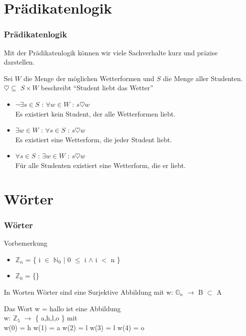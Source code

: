 \documentclass{beamer}
\begin{document}
\section{Prädikatenlogik}
\begin{frame}
	\frametitle{Prädikatenlogik}
	Mit der Prädikatenlogik können wir viele Sachverhalte kurz und präzise 				darstellen.
	\pause
	\begin{block}{}
		Sei $W$ die Menge der möglichen Wetterformen und $S$ die Menge aller 				Studenten.\\
		$\heartsuit \subseteq$ $S \times W$ beschreibt "`Student liebt das 					Wetter"'
		\pause
		\begin{itemize}
			\item $\neg\exists s \in S$ : $\forall w \in W$ : $s \heartsuit w$\\
			\pause
			Es existiert kein Student, der alle Wetterformen liebt.
			\pause
			\item $\exists w \in W$ : $\forall s \in S$ : $s \heartsuit w$\\
			\pause
			Es existiert eine Wetterform, die jeder Student liebt.
			\pause
			\item $\forall s \in S$ : $\exists w \in W$ : $s \heartsuit w$\\
			\pause
			Für alle Studenten existiert eine Wetterform, die er liebt.
		\end{itemize}
	\end{block}
\end{frame}

\section{W\"orter}
\begin{frame}
	\frametitle{Wörter}
	\begin{block}{Vorbemerkung}
		\begin{itemize}
			\item $\mathbb Z_n$ = \pause \{ i $ \in $ $\mathbb N_0$ $ | $ 0 $ \le $ i $ \land $ i $ < $ n \}
			\item $\mathbb Z_0$ = \pause \{\}
		\end{itemize}
	\end{block}
	\begin{block}{In Worten}
		Wörter sind eine Surjektive Abbildung mit w: $\mathbb G_n$ $\rightarrow$ B $\subset$ A \\
		\begin{example}
			Das Wort w = hallo ist eine Abbildung \\
			w: $\mathbb Z_5$ $\rightarrow$ \{ a,h,l,o \} mit \\
			w(0) = h w(1) = a w(2) = l w(3) = l w(4) = o
		\end{example}
	\end{block}
\end{frame}
\end{document}
